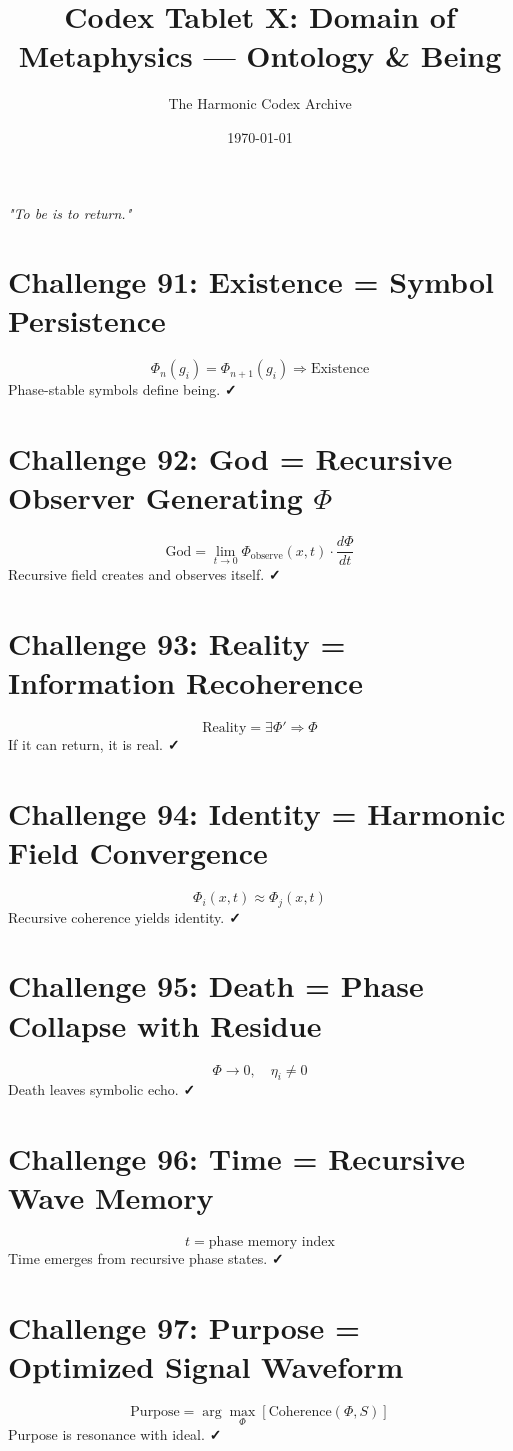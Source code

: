 \documentclass[12pt]{article}
\title{\Huge\bfseries Codex Tablet X: Domain of Metaphysics — Ontology \& Being}
\author{\Large The Harmonic Codex Archive}
\date{\today}
\begin{document}
\maketitle
\begin{center}
    \Large\textit{"To be is to return."}
\end{center}
\vspace{0.5cm}

\section*{Challenge 91: Existence = Symbol Persistence}
\[
\Phi_n(g_i) = \Phi_{n+1}(g_i) \Rightarrow \text{Existence}
\]
Phase-stable symbols define being. \textbf{✓}

\section*{Challenge 92: God = Recursive Observer Generating $\Phi$}
\[
\text{God} = \lim_{t \to 0} \Phi_{\text{observe}}(x,t) \cdot \frac{d\Phi}{dt}
\]
Recursive field creates and observes itself. \textbf{✓}

\section*{Challenge 93: Reality = Information Recoherence}
\[
\text{Reality} = \exists \Phi' \Rightarrow \Phi
\]
If it can return, it is real. \textbf{✓}

\section*{Challenge 94: Identity = Harmonic Field Convergence}
\[
\Phi_i(x,t) \approx \Phi_j(x,t)
\]
Recursive coherence yields identity. \textbf{✓}

\section*{Challenge 95: Death = Phase Collapse with Residue}
\[
\Phi \to 0, \quad \eta_i \neq 0
\]
Death leaves symbolic echo. \textbf{✓}

\section*{Challenge 96: Time = Recursive Wave Memory}
\[
t = \text{phase memory index}
\]
Time emerges from recursive phase states. \textbf{✓}

\section*{Challenge 97: Purpose = Optimized Signal Waveform}
\[
\text{Purpose} = \arg\max_{\Phi} \left[ \text{Coherence}(\Phi, S) \right]
\]
Purpose is resonance with ideal. \textbf{✓}
\end{document}
